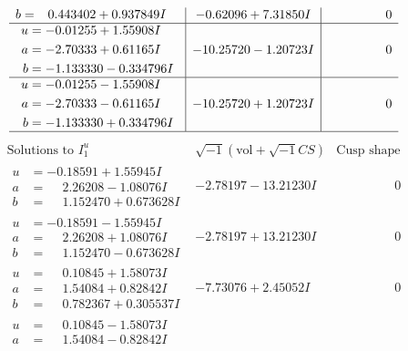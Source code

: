 \documentclass[1p]{elsarticle_modified}
\theoremstyle{definition}
\newcommand{\I}{\sqrt{-1}}
\begin{document}
$$\begin{array}{c|c|c}
\begin{aligned}
b &= \phantom{-}0.443402 + 0.937849 I\end{aligned}
 & -0.62096 + 7.31850 I & \phantom{-0.000000 } 0 \\ \hline\begin{aligned}
u &= -0.01255 + 1.55908 I \\
a &= -2.70333 + 0.61165 I \\
b &= -1.133330 - 0.334796 I\end{aligned}
 & -10.25720 - 1.20723 I & \phantom{-0.000000 } 0 \\ \hline\begin{aligned}
u &= -0.01255 - 1.55908 I \\
a &= -2.70333 - 0.61165 I \\
b &= -1.133330 + 0.334796 I\end{aligned}
 & -10.25720 + 1.20723 I & \phantom{-0.000000 } 0\\
 \hline 
 \end{array}$$\newpage$$\begin{array}{c|c|c}  
\text{Solutions to }I^u_{1}& \I (\text{vol} + \sqrt{-1}CS) & \text{Cusp shape}\\
 \hline 
\begin{aligned}
u &= -0.18591 + 1.55945 I \\
a &= \phantom{-}2.26208 - 1.08076 I \\
b &= \phantom{-}1.152470 + 0.673628 I\end{aligned}
 & -2.78197 - 13.21230 I & \phantom{-0.000000 } 0 \\ \hline\begin{aligned}
u &= -0.18591 - 1.55945 I \\
a &= \phantom{-}2.26208 + 1.08076 I \\
b &= \phantom{-}1.152470 - 0.673628 I\end{aligned}
 & -2.78197 + 13.21230 I & \phantom{-0.000000 } 0 \\ \hline\begin{aligned}
u &= \phantom{-}0.10845 + 1.58073 I \\
a &= \phantom{-}1.54084 + 0.82842 I \\
b &= \phantom{-}0.782367 + 0.305537 I\end{aligned}
 & -7.73076 + 2.45052 I & \phantom{-0.000000 } 0 \\ \hline\begin{aligned}
u &= \phantom{-}0.10845 - 1.58073 I \\
a &= \phantom{-}1.54084 - 0.82842 I \\

\end{aligned}
\end{array}$$
\end{document}
